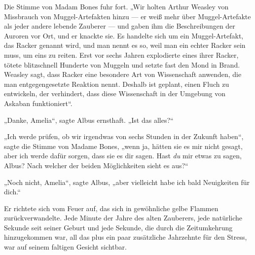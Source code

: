 Die Stimme von Madam Bones fuhr fort.
„Wir holten Arthur Weasley von Missbrauch von Muggel-Artefakten hinzu — er weiß mehr über Muggel-Artefakte als jeder andere lebende Zauberer — und gaben ihm die Beschreibungen der Auroren vor Ort, und er knackte sie. Es handelte sich um ein Muggel-Artefakt, das Racker genannt wird, und man nennt es so, weil man ein echter Racker sein muss, um eins zu reiten. Erst vor sechs Jahren explodierte eines ihrer Racker, tötete blitzschnell Hunderte von Muggeln und setzte fast den Mond in Brand. Weasley sagt, dass Racker eine besondere Art von Wissenschaft anwenden, die man entgegengesetzte Reaktion nennt. Deshalb ist geplant, einen Fluch zu entwickeln, der verhindert, dass diese Wissenschaft in der Umgebung von Askaban funktioniert“.

„Danke, Amelia“, sagte Albus ernsthaft.
„Ist das alles?“

„Ich werde prüfen, ob wir irgendwas von sechs Stunden in der Zukunft haben“, sagte die Stimme von Madame Bones, „wenn ja, hätten sie es mir nicht gesagt, aber ich werde dafür sorgen, dass sie es dir sagen. Hast \emph{du} mir etwas zu sagen, Albus? Nach welcher der beiden Möglichkeiten sieht es aus?“

„Noch nicht, Amelia“, sagte Albus, „aber vielleicht habe ich bald Neuigkeiten für dich.“

Er richtete sich vom Feuer auf, das sich in gewöhnliche gelbe Flammen zurückverwandelte. Jede Minute der Jahre des alten Zauberers, jede natürliche Sekunde seit seiner Geburt und jede Sekunde, die durch die Zeitumkehrung hinzugekommen war, all das plus ein paar zusätzliche Jahrzehnte für den Stress, war auf seinem faltigen Gesicht sichtbar.

